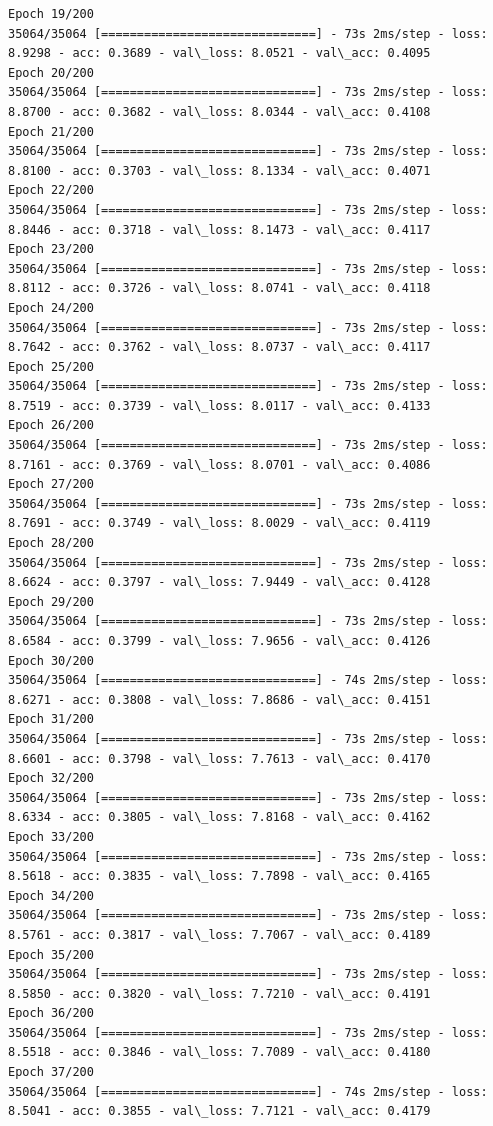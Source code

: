 \documentclass[11pt]{article}
\begin{document}
\begin{Verbatim}[commandchars=\\\{\}]
Epoch 19/200
35064/35064 [==============================] - 73s 2ms/step - loss: 8.9298 - acc: 0.3689 - val\_loss: 8.0521 - val\_acc: 0.4095
Epoch 20/200
35064/35064 [==============================] - 73s 2ms/step - loss: 8.8700 - acc: 0.3682 - val\_loss: 8.0344 - val\_acc: 0.4108
Epoch 21/200
35064/35064 [==============================] - 73s 2ms/step - loss: 8.8100 - acc: 0.3703 - val\_loss: 8.1334 - val\_acc: 0.4071
Epoch 22/200
35064/35064 [==============================] - 73s 2ms/step - loss: 8.8446 - acc: 0.3718 - val\_loss: 8.1473 - val\_acc: 0.4117
Epoch 23/200
35064/35064 [==============================] - 73s 2ms/step - loss: 8.8112 - acc: 0.3726 - val\_loss: 8.0741 - val\_acc: 0.4118
Epoch 24/200
35064/35064 [==============================] - 73s 2ms/step - loss: 8.7642 - acc: 0.3762 - val\_loss: 8.0737 - val\_acc: 0.4117
Epoch 25/200
35064/35064 [==============================] - 73s 2ms/step - loss: 8.7519 - acc: 0.3739 - val\_loss: 8.0117 - val\_acc: 0.4133
Epoch 26/200
35064/35064 [==============================] - 73s 2ms/step - loss: 8.7161 - acc: 0.3769 - val\_loss: 8.0701 - val\_acc: 0.4086
Epoch 27/200
35064/35064 [==============================] - 73s 2ms/step - loss: 8.7691 - acc: 0.3749 - val\_loss: 8.0029 - val\_acc: 0.4119
Epoch 28/200
35064/35064 [==============================] - 73s 2ms/step - loss: 8.6624 - acc: 0.3797 - val\_loss: 7.9449 - val\_acc: 0.4128
Epoch 29/200
35064/35064 [==============================] - 73s 2ms/step - loss: 8.6584 - acc: 0.3799 - val\_loss: 7.9656 - val\_acc: 0.4126
Epoch 30/200
35064/35064 [==============================] - 74s 2ms/step - loss: 8.6271 - acc: 0.3808 - val\_loss: 7.8686 - val\_acc: 0.4151
Epoch 31/200
35064/35064 [==============================] - 73s 2ms/step - loss: 8.6601 - acc: 0.3798 - val\_loss: 7.7613 - val\_acc: 0.4170
Epoch 32/200
35064/35064 [==============================] - 73s 2ms/step - loss: 8.6334 - acc: 0.3805 - val\_loss: 7.8168 - val\_acc: 0.4162
Epoch 33/200
35064/35064 [==============================] - 73s 2ms/step - loss: 8.5618 - acc: 0.3835 - val\_loss: 7.7898 - val\_acc: 0.4165
Epoch 34/200
35064/35064 [==============================] - 73s 2ms/step - loss: 8.5761 - acc: 0.3817 - val\_loss: 7.7067 - val\_acc: 0.4189
Epoch 35/200
35064/35064 [==============================] - 73s 2ms/step - loss: 8.5850 - acc: 0.3820 - val\_loss: 7.7210 - val\_acc: 0.4191
Epoch 36/200
35064/35064 [==============================] - 73s 2ms/step - loss: 8.5518 - acc: 0.3846 - val\_loss: 7.7089 - val\_acc: 0.4180
Epoch 37/200
35064/35064 [==============================] - 74s 2ms/step - loss: 8.5041 - acc: 0.3855 - val\_loss: 7.7121 - val\_acc: 0.4179

\end{Verbatim}
\end{document}
